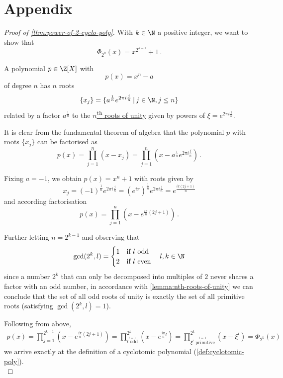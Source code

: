\chapter*{Appendix}
\label{chap:appendix}

\begin{proof}[Proof of \autoref{thm:power-of-2-cyclo-poly}]
  With $k \in \N$ a positive integer, we want to show that
  $$\Phi_{2^k} (x) = x^{2^{k-1}} + 1\,.$$

  A polynomial $p \in \Z[X]$ with $$p(x) = x^n - a$$ of degree $n$ has $n$ roots
  $$\{x_j\} = \{a^\frac{1}{n} e^{2\pi i \frac{j}{n}} \,|\, j \in \N, j \leq n\}$$
  related by a factor $a^\frac{1}{n}$ to the
  \hyperref[lemma:nth-roots-of-unity]{$n$\textsuperscript{th} roots of unity} given by powers of
  $\xi = e^{2\pi i \frac{1}{n}}$.

  It is clear from the fundamental theorem of algebra that the polynomial $p$ with roots $\{x_j\}$
  can be factorised as
  $$p(x) = \prod_{j=1}^{n} (x - x_j) = \prod_{j=1}^{n} (x - a^\frac{1}{n} e^{2\pi i \frac{j}{n}})\,.$$

  Fixing $a = -1$, we obtain $p(x) = x^n + 1$ with roots given by
  $$x_j = (-1)^\frac{1}{n} e^{2\pi i \frac{j}{n}}
    = (e^{i\pi})^\frac{1}{n} e^{2\pi i \frac{j}{n}}
    = e^{\frac{i\pi (2j + 1)}{n}}$$
  and according factorisation
  $$p(x) = \prod_{j=1}^{n} (x - e^{\frac{i\pi}{n} (2j + 1)})\,.$$

  Further letting $n = 2^{k-1}$ and observing that
  $$\gcd(2^k, l) = \begin{cases}
      1 & \text{if } l \text{ odd}  \\
      2 & \text{if } l \text{ even}
    \end{cases} \quad l, k \in \N$$
  since a number $2^k$ that can only be decomposed into multiples of $2$
  never shares a factor with an odd number, in accordance with \autoref{lemma:nth-roots-of-unity}
  we can conclude that the set of all odd roots of unity is exactly the set of all primitive roots
  (satisfying $\gcd(2^k, l) = 1$).

  Following from above,
  \begin{align*}
    p(x) = \prod_{j=1}^{2^{k-1}} (x - e^{\frac{i\pi}{n} (2j + 1)})
    = \prod_{\stackrel{l=1}{l \text{ odd}}}^{2^k} (x - e^{\frac{i\pi}{n} l})
    = \prod_{\stackrel{l=1}{\xi^l \text{ primitive}}}^{2^k} (x - \xi^l)
    = \Phi_{2^k}(x)
  \end{align*}
  we arrive exactly at the definition of a cyclotomic polynomial (\autoref{def:cyclotomic-poly}). \\
  \parencite{power-of-2-cyclo-poly}
\end{proof}

